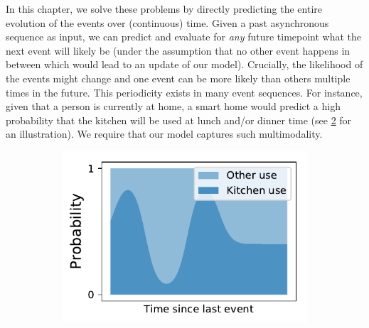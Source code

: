 In this chapter, we solve these problems by directly predicting the entire evolution of the events over (continuous) time. Given a past asynchronous sequence as input, we can predict and evaluate for \textit{any} future timepoint what the next event will likely be (under the assumption that no other event happens in between which would lead to an update of our model). Crucially, the likelihood of the events might change and one event can be more likely than others multiple times in the future. This periodicity exists in many event sequences. For instance, given that a person is currently at home, a smart home would predict a high probability that the kitchen will be used at lunch and/or dinner time (see \cref{fig:kitchen_categorical} for an illustration). We require that our model captures such multimodality.

\begin{figure}
        \vspace{-0.5cm}
        \centering
        \begin{subfigure}{.5 \linewidth}
                \centering
                \includegraphics[width=\linewidth]{sections/010_neurips2019/paper/images/categorical_evolution2.pdf}
                \vspace*{-0.6cm}
                \caption{}
                \label{fig:kitchen_categorical}

\end{subfigure}
\end{figure}
